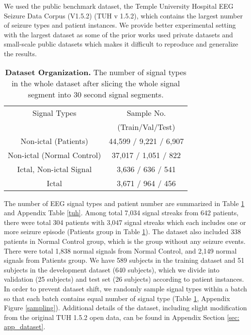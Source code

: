 \documentclass[pmlr,twocolumn,10pt]{jmlr}
\begin{document}
We used the public benchmark dataset, the Temple University Hospital EEG Seizure Data Corpus (V1.5.2) \citep{obeid2016temple} (TUH v 1.5.2), which contains the largest number of seizure types and patient instances. We provide better experimental setting with the largest dataset as some of the prior works used private datasets \citep{daoud2019efficient} and small-scale public datasets \citep{akbarian2020framework, fan2018detecting, zabihi2015analysis} which makes it difficult to reproduce and generalize the results. 

\begin{table}[ht]
	\small
	\centering
	\caption{\textbf{Dataset Organization.} The number of signal types in the whole dataset after slicing the whole signal segment into 30 second signal segments.}
	\label{dataset}
	\begin{tabular}{c|c}
		\toprule
		Signal Types & Sample No.\\
		&(Train/Val/Test)\\
		\midrule
		Non-ictal (Patients) & 44,599 / 9,221 / 6,907\\
		Non-ictal (Normal Control) & 37,017 / 1,051 / 822\\
		Ictal, Non-ictal Signal & 3,636  / 636 / 541\\
		Ictal & 3,671 / 964 / 456\\
		\bottomrule
	\end{tabular}
\end{table}
%
 The number of EEG signal types and patient number are summarized in Table \ref{dataset} and Appendix Table \ref{tuh}. Among total 7,034 signal streaks from 642 patients, there were total 304 patients with 3,047 signal streaks which each includes one or more seizure episode (Patients group in Table \ref{dataset}). The dataset also included 338 patients in Normal Control group, which is the group without any seizure events. There were total 1,838 normal signals from Normal Control, and 2,149 normal signals from Patients group. We have 589 subjects in the training dataset and 51 subjects in the development dataset (640 subjects), which we divide into validation (25 subjects) and test set (26 subjects) according to patient instances.
In order to prevent dataset shift, we randomly sample signal types within a batch so that each batch contains equal number of signal type (Table \ref{dataset}, Appendix Figure \ref{sampling}). Additional details of the dataset, including slight modification from the original TUH 1.5.2 open data, can be found in Appendix Section \ref{sec: app_dataset}.
\end{document}
